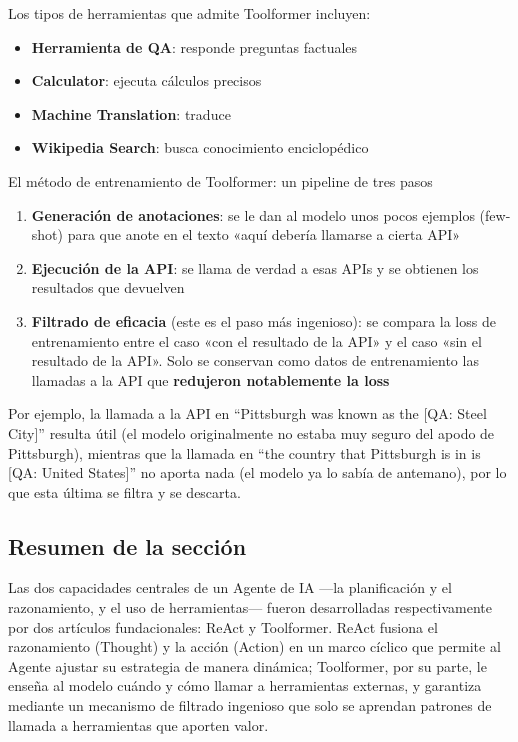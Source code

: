 Los tipos de herramientas que admite Toolformer incluyen:
\begin{itemize}
    \item \textbf{Herramienta de QA}: responde preguntas factuales
    \item \textbf{Calculator}: ejecuta cálculos precisos
    \item \textbf{Machine Translation}: traduce
    \item \textbf{Wikipedia Search}: busca conocimiento enciclopédico
\end{itemize}

\begin{knowledgebox}{El método de entrenamiento de Toolformer: un pipeline de tres pasos}
\begin{enumerate}
    \item \textbf{Generación de anotaciones}: se le dan al modelo unos pocos ejemplos (few-shot) para que anote en el texto «aquí debería llamarse a cierta API»
    \item \textbf{Ejecución de la API}: se llama de verdad a esas APIs y se obtienen los resultados que devuelven
    \item \textbf{Filtrado de eficacia} (este es el paso más ingenioso): se compara la loss de entrenamiento entre el caso «con el resultado de la API» y el caso «sin el resultado de la API». Solo se conservan como datos de entrenamiento las llamadas a la API que \textbf{redujeron notablemente la loss}
\end{enumerate}
Por ejemplo, la llamada a la API en ``Pittsburgh was known as the {[}QA: Steel City{]}'' resulta útil (el modelo originalmente no estaba muy seguro del apodo de Pittsburgh), mientras que la llamada en ``the country that Pittsburgh is in is {[}QA: United States{]}'' no aporta nada (el modelo ya lo sabía de antemano), por lo que esta última se filtra y se descarta.
\end{knowledgebox}

\subsection{Resumen de la sección}

Las dos capacidades centrales de un Agente de IA —la planificación y el razonamiento, y el uso de herramientas— fueron desarrolladas respectivamente por dos artículos fundacionales: ReAct y Toolformer. ReAct fusiona el razonamiento (Thought) y la acción (Action) en un marco cíclico que permite al Agente ajustar su estrategia de manera dinámica; Toolformer, por su parte, le enseña al modelo cuándo y cómo llamar a herramientas externas, y garantiza mediante un mecanismo de filtrado ingenioso que solo se aprendan patrones de llamada a herramientas que aporten valor.
